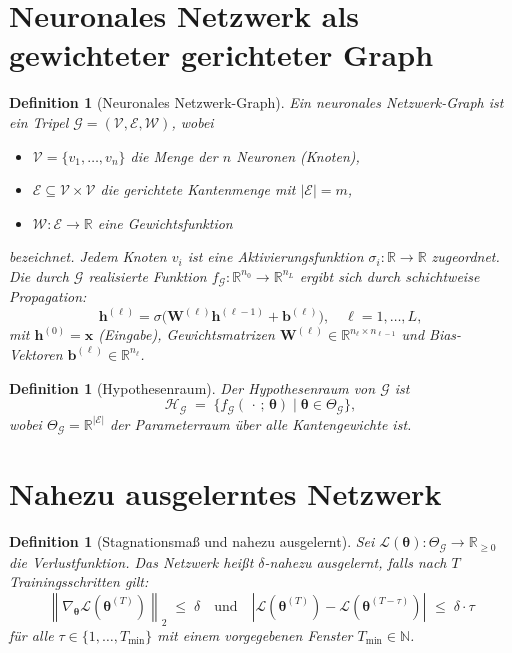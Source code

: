﻿\documentclass[12pt, a4paper, openany]{report}
\newtheorem{definition}[theorem]{Definition}
\newcommand{\R}{\mathbb{R}}
\newcommand{\N}{\mathbb{N}}
\newcommand{\calG}{\mathcal{G}}
\newcommand{\calH}{\mathcal{H}}
\newcommand{\calL}{\mathcal{L}}
\newcommand{\calV}{\mathcal{V}}
\newcommand{\calE}{\mathcal{E}}
\newcommand{\calW}{\mathcal{W}}
\newcommand{\norms}[1]{\left\|#1\right\|}
\newcommand{\abs}[1]{\left|#1\right|}
\begin{document}
\section{Neuronales Netzwerk als gewichteter gerichteter Graph}

\begin{definition}[Neuronales Netzwerk-Graph]
\label{def:nngraph}
Ein \emph{neuronales Netzwerk-Graph} ist ein Tripel
$\calG = (\calV, \calE, \calW)$, wobei
\begin{itemize}
  \item $\calV = \{v_1, \ldots, v_n\}$ die Menge der $n$ Neuronen (Knoten),
  \item $\calE \subseteq \calV \times \calV$ die gerichtete Kantenmenge mit
        $|\calE| = m$,
  \item $\calW : \calE \to \R$ eine Gewichtsfunktion
\end{itemize}
bezeichnet.  Jedem Knoten $v_i$ ist eine Aktivierungsfunktion
$\sigma_i : \R \to \R$ zugeordnet.  Die durch $\calG$ realisierte Funktion
$f_{\calG} : \R^{n_0} \to \R^{n_L}$ ergibt sich durch schichtweise Propagation:
\begin{equation}
  \label{eq:propagation}
  \bm{h}^{(\ell)} = \sigma\!\bigl(\bm{W}^{(\ell)} \bm{h}^{(\ell-1)} + \bm{b}^{(\ell)}\bigr),
  \quad \ell = 1, \ldots, L,
\end{equation}
mit $\bm{h}^{(0)} = \bm{x}$ (Eingabe), Gewichtsmatrizen
$\bm{W}^{(\ell)} \in \R^{n_\ell \times n_{\ell-1}}$ und Bias-Vektoren
$\bm{b}^{(\ell)} \in \R^{n_\ell}$.
\end{definition}

\begin{definition}[Hypothesenraum]
\label{def:hyp}
Der \emph{Hypothesenraum} von $\calG$ ist
\[
  \calH_{\calG} \;=\;
  \bigl\{f_{\calG}(\,\cdot\,;\,\bm{\theta}) \;\big|\; \bm{\theta} \in \Theta_{\calG}\bigr\},
\]
wobei $\Theta_{\calG} = \R^{|\calE|}$ der Parameterraum über alle Kantengewichte ist.
\end{definition}

\section{Nahezu ausgelerntes Netzwerk}

\begin{definition}[Stagnationsmaß und nahezu ausgelernt]
\label{def:nearconv}
Sei $\calL(\bm{\theta}) : \Theta_{\calG} \to \R_{\geq 0}$ die Verlustfunktion.
Das Netzwerk heißt \emph{$\delta$-nahezu ausgelernt}, falls nach $T$ Trainingsschritten
gilt:
\begin{equation}
  \label{eq:stagnation}
  \norms{\nabla_{\bm{\theta}} \calL(\bm{\theta}^{(T)})}_2 \;\leq\; \delta
  \quad \text{und} \quad
  \abs{\calL(\bm{\theta}^{(T)}) - \calL(\bm{\theta}^{(T-\tau)})}_{}
  \;\leq\; \delta \cdot \tau
\end{equation}
für alle $\tau \in \{1, \ldots, T_{\min}\}$ mit einem vorgegebenen Fenster $T_{\min} \in \N$.
\end{definition}
\end{document}
